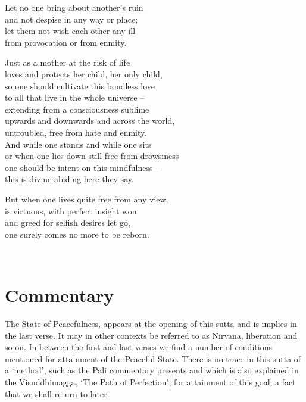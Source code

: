 \begin{MyDescription}[]{}
Let no one bring about another's ruin\\
and not despise in any way or place;\\
let them not wish each other any ill\\
from provocation or from enmity.
\end{MyDescription}   

\begin{MyDescription}[]{}
Just as a mother at the risk of life\\
loves and protects her child, her only child,\\
so one should cultivate this bondless love\\
to all that live in the whole universe – \\
extending from a consciousness sublime\\
upwards and downwards and across the world,\\
untroubled, free from hate and enmity.\\
And while one stands and while one sits\\
or when one lies down still free from drowsiness\\
one should be intent on this mindfulness – \\
this is divine abiding here they say.
\end{MyDescription}      

\begin{MyDescription}[]{}
But when one lives quite free from any view,\\
is virtuous, with perfect insight won\\
and greed for selfish desires let go,\\
one surely comes no more to be reborn.
\end{MyDescription}   
 
 \begin{MyDescription}[(Sn. 143 –- 151)]{}
 \end{MyDescription}  								
\newpage    
 \section{Commentary}
   
   The State of Peacefulness, appears at the opening of this sutta and is implies in the last verse. It may in other contexts be referred to as Nirvana, liberation and so on. In between the first and last verses we find a number of conditions mentioned for attainment of the Peaceful State. There is no trace in this sutta of a `method', such as the Pali commentary presents and which is also explained in the Visuddhimagga, `The Path of Perfection', for attainment of this goal, a fact that we shall return to later.
   
